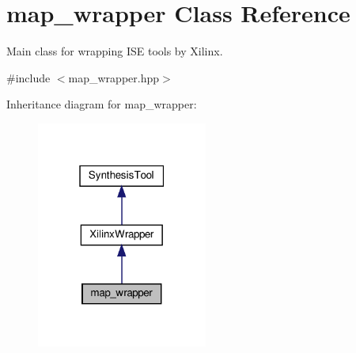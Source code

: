 \hypertarget{classmap__wrapper}{}\section{map\+\_\+wrapper Class Reference}
\label{classmap__wrapper}


Main class for wrapping I\+SE tools by Xilinx.  




{\ttfamily \#include $<$map\+\_\+wrapper.\+hpp$>$}



Inheritance diagram for map\+\_\+wrapper\+:
\nopagebreak
\begin{figure}[H]
\begin{center}
\leavevmode
\includegraphics[width=159pt]{d1/dd6/classmap__wrapper__inherit__graph}
\end{center}
\end{figure}


